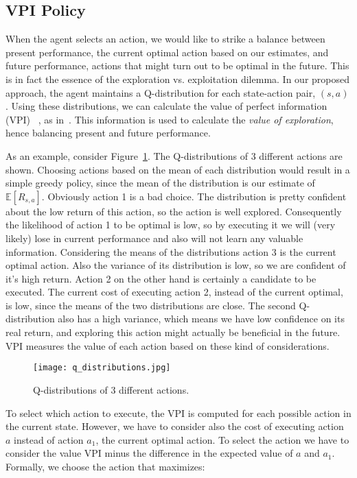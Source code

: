 \subsection{VPI Policy}
When the agent selects an action, we would like to strike a balance between present performance, the current optimal action based on our estimates, and future performance, actions that might turn out to be optimal in the future. This is in fact the essence of the exploration vs. exploitation dilemma. In our proposed approach, the agent maintains a Q-distribution for each state-action pair, $(s,a)$. Using these distributions, we can calculate the value of perfect information (VPI) ~\cite{4082064,Russell:1991:RTS:110787}, as in~\cite{Dearden98bayesianq-learning}. This information is used to calculate the \emph{value of exploration}, hence balancing present and future performance.\par
As an example, consider Figure~\ref{fig:q_distributions}. The Q-distributions of 3 different actions are shown. Choosing actions based on the mean of each distribution would result in a simple greedy policy, since the mean of the distribution is our estimate of $\mathbb{E}[R_{s,a}]$. Obviously action 1 is a bad choice. The distribution is pretty confident about the low return of this action, so the action is well explored. Consequently the likelihood of action 1 to be optimal is low, so by executing it we  will (very likely) lose in current performance and also will not learn any valuable information. Considering the means of the distributions action 3 is the current optimal action. Also the variance of its distribution is low, so we are confident of it's high return. Action 2 on the other hand is certainly a candidate to be executed. The current cost of executing action 2, instead of the current optimal, is low, since the means of the two distributions are close. The second Q-distribution also has a high variance, which means we have low confidence on its real return, and exploring this action might actually be beneficial in the future. VPI measures the value of each action based on these kind of considerations.
\begin{figure}
 \texttt{[image: q\_distributions.jpg]}
 \caption{Q-distributions of 3 different actions.}
 \label{fig:q_distributions}
\end{figure}
To select which action to execute, the VPI is computed for each possible action in the current state. However, we have to consider also the cost of executing action $a$ instead of action $a_1$, the current optimal action. To select the action we have to consider the value VPI minus the difference in the expected value of $a$ and $a_1$. Formally, we choose the action that maximizes:
